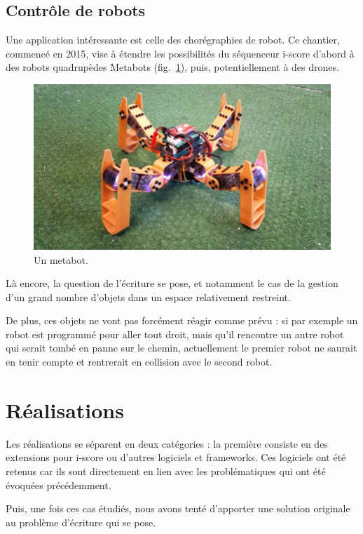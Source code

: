 \documentclass[french]{article}
\begin{document}
\subsection{Contrôle de robots}
Une application intéressante est celle des chorégraphies de robot. Ce chantier, commencé en 2015, vise à étendre les possibilités du séquenceur i-score d'abord à des robots quadrupèdes Metabots (fig.~\ref{fig.metabots}), puis, potentiellement à des drones.

\begin{figure}[h]
\centering
\includegraphics[scale=0.2]{images/spidey.jpg}
\caption{Un metabot.}
\label{fig.metabots}
\end{figure} %

Là encore, la question de l'écriture se pose, et notamment le cas de la gestion d'un grand nombre d'objets dans un espace relativement restreint.

De plus, ces objets ne vont pas forcément réagir comme prévu : si par exemple un robot est programmé pour aller tout droit, mais qu'il rencontre un autre robot qui serait tombé en panne sur le chemin, actuellement le premier robot ne saurait en tenir compte et rentrerait en collision avec le second robot.


\section{Réalisations}
Les réalisations se séparent en deux catégories : la première consiste en des extensions pour i-score ou d'autres logiciels et frameworks. Ces logiciels ont été retenus car ils sont directement en lien avec les problématiques qui ont été évoquées précédemment.

Puis, une fois ces cas étudiés, nous avons tenté d'apporter une solution originale au problème d'écriture qui se pose.
\end{document}
